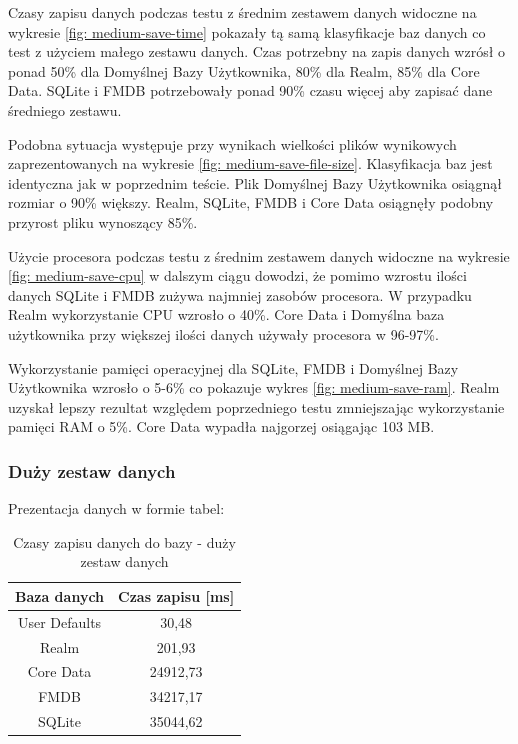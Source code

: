 \newpage

Czasy zapisu danych podczas testu z średnim zestawem danych  widoczne na wykresie \ref{fig: medium-save-time} pokazały tą samą klasyfikacje baz danych co test z użyciem małego zestawu danych. Czas potrzebny na zapis danych wzrósł o ponad 50\% dla Domyślnej Bazy Użytkownika, 80\% dla Realm, 85\% dla Core Data. SQLite i FMDB potrzebowały ponad 90\% czasu więcej aby zapisać dane średniego zestawu. \par

Podobna sytuacja występuje przy wynikach wielkości plików wynikowych zaprezentowanych na wykresie \ref{fig: medium-save-file-size}. Klasyfikacja baz jest identyczna jak w poprzednim teście. Plik Domyślnej Bazy Użytkownika osiągnął rozmiar  o 90\% większy. Realm, SQLite, FMDB i Core Data osiągnęły podobny przyrost pliku wynoszący 85\%. \par 

Użycie procesora podczas testu z średnim zestawem danych widoczne na wykresie \ref{fig: medium-save-cpu} w dalszym ciągu dowodzi, że pomimo wzrostu ilości danych SQLite i FMDB zużywa najmniej zasobów procesora. W przypadku Realm wykorzystanie CPU wzrosło o 40\%. Core Data i Domyślna baza użytkownika przy większej ilości danych używały procesora w 96-97\%. \par 

Wykorzystanie pamięci operacyjnej dla SQLite, FMDB i Domyślnej Bazy Użytkownika wzrosło o 5-6\% co pokazuje wykres \ref{fig: medium-save-ram}. Realm uzyskał lepszy rezultat względem poprzedniego testu zmniejszając wykorzystanie pamięci RAM o 5\%. Core Data wypadła najgorzej osiągając 103 MB. \par


\subsubsection{Duży zestaw danych}

Prezentacja danych w formie tabel: 

\begin{table}[h]
\centering
\caption{Czasy zapisu danych do bazy - duży zestaw danych}
\label{tab: big-save-time-table}
\begin{tabular}{|c|c|}
\hline
Baza danych   & Czas zapisu [ms] \\ \hline
User Defaults & 30,48            \\ \hline
Realm         & 201,93           \\ \hline
Core Data     & 24912,73         \\ \hline
FMDB          & 34217,17         \\ \hline
SQLite        & 35044,62         \\ \hline
\end{tabular}
\end{table}

